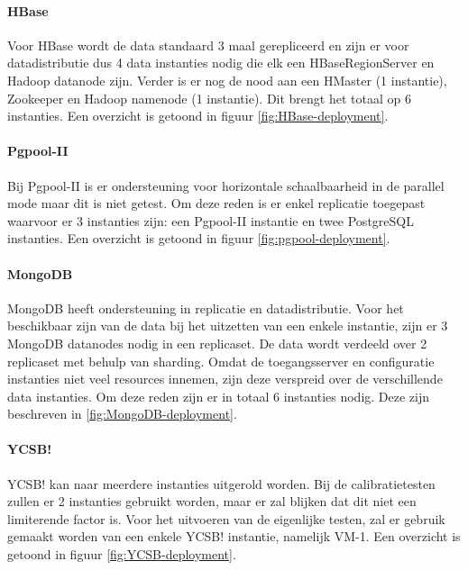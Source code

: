 \paragraph{HBase} Voor HBase wordt de data standaard 3 maal gerepliceerd en zijn er voor datadistributie dus 4 data instanties nodig die elk een HBaseRegionServer en Hadoop datanode zijn. Verder is er nog de nood aan een HMaster (1 instantie), Zookeeper en Hadoop namenode (1 instantie). Dit brengt het totaal op 6 instanties. Een overzicht is getoond in figuur \ref{fig:HBase-deployment}. 

\paragraph{Pgpool-II} Bij Pgpool-II is er ondersteuning voor horizontale schaalbaarheid in de parallel mode maar dit is niet getest. Om deze reden is er enkel replicatie toegepast waarvoor er 3 instanties zijn: een Pgpool-II instantie en twee PostgreSQL instanties. Een overzicht is getoond in figuur \ref{fig:pgpool-deployment}. 

\paragraph{MongoDB} MongoDB heeft ondersteuning in replicatie en datadistributie. Voor het beschikbaar zijn van de data bij het uitzetten van een enkele instantie, zijn er 3 MongoDB datanodes nodig in een replicaset. De data wordt verdeeld over 2 replicaset met behulp van sharding. Omdat de toegangsserver en configuratie instanties niet veel resources innemen, zijn deze verspreid over de verschillende data instanties. Om deze reden zijn er in totaal 6 instanties nodig. Deze zijn beschreven in \ref{fig:MongoDB-deployment}. 

\paragraph{YCSB!} YCSB! kan naar meerdere instanties uitgerold worden. Bij de calibratietesten zullen er 2 instanties gebruikt worden, maar er zal blijken dat dit niet een limiterende factor is. Voor het uitvoeren van de eigenlijke testen, zal er gebruik gemaakt worden van een enkele YCSB! instantie, namelijk VM-1.  Een overzicht is getoond in figuur \ref{fig:YCSB-deployment}. 


